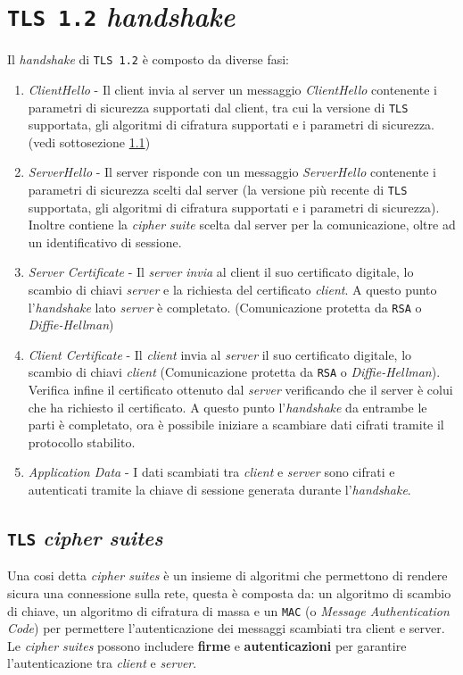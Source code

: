 \section{\texttt{TLS 1.2} \textit{handshake}}
    Il \textit{handshake} di \texttt{TLS 1.2} è composto da diverse fasi: \begin{enumerate}
        \item \textit{ClientHello} - Il client invia al server un messaggio \textit{ClientHello} contenente i parametri di sicurezza supportati dal client, tra cui la versione di \texttt{TLS} supportata, gli algoritmi di cifratura supportati e i parametri di sicurezza. (vedi sottosezione \ref{subsec:TLSciphersuites})
        \item \textit{ServerHello} - Il server risponde con un messaggio \textit{ServerHello} contenente i parametri di sicurezza scelti dal server (la versione più recente di \texttt{TLS} supportata, gli algoritmi di cifratura supportati e i parametri di sicurezza). Inoltre contiene la \textit{cipher suite} scelta dal server per la comunicazione, oltre ad un identificativo di sessione.
        \item \textit{Server Certificate} - Il \textit{server} \textit{invia} al client il suo certificato digitale, lo scambio di chiavi \textit{server} e la richiesta del certificato \textit{client}. A questo punto l'\textit{handshake} lato \textit{server} è completato. (Comunicazione protetta da \texttt{RSA} o \textit{Diffie-Hellman})
        \item \textit{Client Certificate} - Il \textit{client} invia al \textit{server} il suo certificato digitale, lo scambio di chiavi \textit{client} (Comunicazione protetta da \texttt{RSA} o \textit{Diffie-Hellman}). Verifica infine il certificato ottenuto dal \textit{server} verificando che il server è colui che ha richiesto il certificato. A questo punto l'\textit{handshake} da entrambe le parti è completato, ora è possibile iniziare a scambiare dati cifrati tramite il protocollo stabilito.
        \item \textit{Application Data} - I dati scambiati tra \textit{client} e \textit{server} sono cifrati e autenticati tramite la chiave di sessione generata durante l'\textit{handshake}.
    \end{enumerate}
    \subsection{\texttt{TLS} \textit{cipher suites}}
        \label{subsec:TLSciphersuites}
        Una cosi detta \textit{cipher suites} è un insieme di algoritmi che permettono di rendere sicura una connessione sulla rete, questa è composta da: un algoritmo di scambio di chiave, un algoritmo di cifratura di massa e un \texttt{MAC} (o \textit{Message Authentication Code}) per permettere l'autenticazione dei messaggi scambiati tra client e server. Le \textit{cipher suites} possono includere \textbf{firme} e \textbf{autenticazioni} per garantire l'autenticazione tra \textit{client} e \textit{server}.
